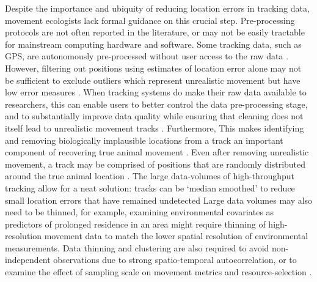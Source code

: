 \begin{refsection}
    Despite the importance and ubiquity of reducing location errors in tracking data, movement ecologists lack formal guidance on this crucial step.
    Pre-processing protocols are not often reported in the literature, or may not be easily tractable for mainstream computing hardware and software.
    Some tracking data, such as GPS, are autonomously pre-processed without user access to the raw data \cite[using error estimates and Kalman smooths;][and substantial location errors may yet persist]{kaplan2005}.
    However, filtering out positions using estimates of location error alone may not be sufficient to exclude outliers which represent unrealistic movement but have low error measures \cite{weiser2016, ranacher2016}.
    When tracking systems do make their raw data available to researchers, this can enable users to better control the data pre-processing stage, and to substantially improve data quality while ensuring that cleaning does not itself lead to unrealistic movement tracks \cite[e.g. Kalman smooths which distort tracks,][]{kaplan2005}.
    Furthermore, 
    This makes identifying and removing biologically implausible locations from a track an important component of recovering true animal movement \cite{bjorneraas2010}.
    Even after removing unrealistic movement, a track may be comprised of positions that are randomly distributed around the true animal location \cite{noonan2019}.
    The large data-volumes of high-throughput tracking allow for a neat solution: tracks can be `median smoothed' to reduce small location errors that have remained undetected \cite[e.g.][]{bijleveld2016} 
    Large data volumes may also need to be thinned, for example, examining environmental covariates as predictors of prolonged residence in an area  \cite[see e.g.][]{bracis2018, aarts2008, bijleveld2016, oudman2018, harel2016} might require thinning of high-resolution movement data to match the lower spatial resolution of environmental measurements. 
    Data thinning and clustering are also required to avoid non-independent observations due to strong spatio-temporal autocorrelation, or to examine the effect of sampling scale on movement metrics and resource-selection \cite{fleming2014a,noonan2019}.


\end{refsection}
